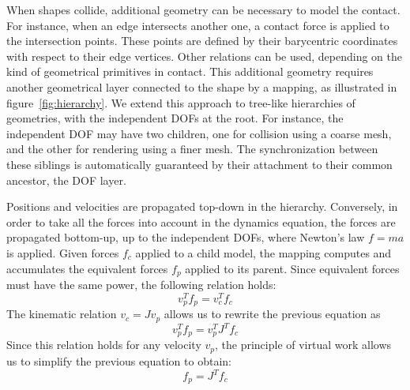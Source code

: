 When shapes collide, additional geometry can be necessary to model the contact.
For instance, when an edge intersects another one, a contact force is applied to the intersection points.
These points are defined by their barycentric coordinates with respect to their edge vertices. 
Other relations can be used, depending on the kind of geometrical primitives in contact.
This additional geometry requires another geometrical layer connected to the shape by a mapping, as illustrated in figure~\ref{fig:hierarchy}.
We extend this approach to tree-like hierarchies of geometries, with the independent DOFs at the root. 
For instance, the independent DOF may have two children, one for collision using a coarse mesh, and the other for rendering using a finer mesh. The synchronization between these siblings is automatically guaranteed by their attachment to their common ancestor, the DOF layer.

Positions and velocities are propagated top-down in the hierarchy. Conversely,
in order to take all the forces into account in the dynamics equation, the forces are propagated bottom-up, up to the independent DOFs, where Newton's law $f=ma$ is applied. 
Given forces $f_c$ applied to a child model, the mapping computes and accumulates the equivalent forces $f_p$ applied to its parent. 
Since equivalent forces must have the same power, the following relation holds:
$$
v_{p}^T f_p = v_c^T f_c
$$
The kinematic relation $v_{c} = J v_{p}$ allows us to rewrite the previous equation as
$$
v_{p}^T f_{p} = v_{p}^T J^T f_c
$$
Since this relation holds for any velocity $v_p$, the principle of virtual work allows us to simplify the previous equation to obtain:
\begin{equation} \label{eq:mapF}
f_{p} = J^T f_c
\end{equation}

